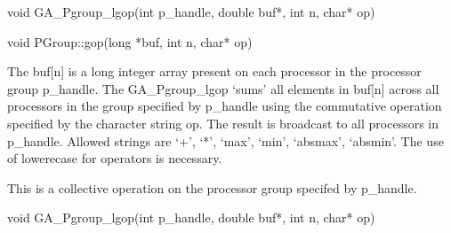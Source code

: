 \documentclass[12pt]{article}
\begin{document}

\begin{capi}
\begin{ccode}
void GA_Pgroup_lgop(int p_handle, double buf*, int n, char* op)
\end{ccode}
\begin{funcargs}
\end{funcargs}
\end{capi}

\begin{cxxapi}
\begin{cxxcode}
void PGroup::gop(long *buf, int n, char* op)
\end{cxxcode}
\begin{funcargs}
\end{funcargs}
\end{cxxapi}
\gcoll
\begin{desc}

The buf[n] is a long integer array present on each processor in the processor group p_handle. The GA_Pgroup_lgop `sums' all elements in buf[n] across all processors in the group specified by p_handle using the commutative operation specified by the character string op.  The result is broadcast to all processors in p_handle. Allowed strings are `+', `*', `max', `min', `absmax', `absmin'. The use of lowerecase for operators is necessary.

This is a collective operation on the processor group specifed by p_handle. 
\end{desc}


\begin{capi}
\begin{ccode}
void GA_Pgroup_lgop(int p_handle, double buf*, int n, char* op)
\end{ccode}
\begin{funcargs}
\end{funcargs}
\end{capi}
\end{document}
